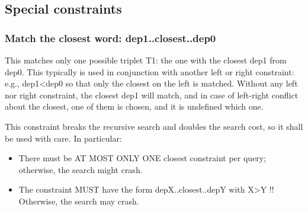 \documentclass{article}
\begin{document}
\subsection{Special constraints}

\subsubsection{Match the closest word: dep1..closest..dep0}

This matches only one possible triplet T1: the one with the closest dep1 from dep0.
This typically is used in conjunction with another left or right constraint: e.g., dep1<dep0
so that only the closest on the left is matched. Without any left nor right constraint,
the closest dep1 will match, and in case of left-right conflict about the closest, one of them
is chosen, and it is undefined which one.

This constraint breaks the recursive search and doubles the search cost, so it shall be used
with care. In particular:
\begin{itemize}
\item There must be AT MOST ONLY ONE closest constraint per query; otherwise, the search might crash.
\item The constraint MUST have the form depX..closest..depY with X>Y !! Otherwise, the search may crash.
\end{itemize}
\end{document}
